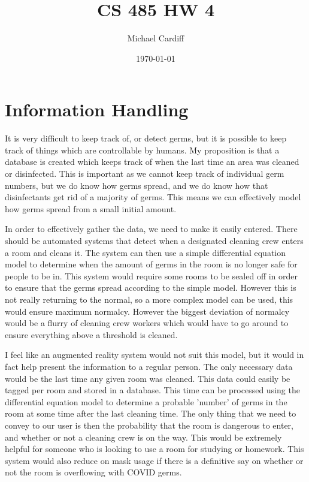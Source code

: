 \documentclass[12pt]{article}
\title{CS 485 HW 4}
\author{Michael Cardiff}
\date{\today}
\begin{document}
\maketitle

\section{Information Handling}
It is very difficult to keep track of, or detect germs, but it is possible to keep track of things which are controllable by humans. My proposition is that a database is created which keeps track of when the last time an area was cleaned or disinfected. This is important as we cannot keep track of individual germ numbers, but we do know how germs spread, and we do know how that disinfectants get rid of a majority of germs. This means we can effectively model how germs spread from a small initial amount. 

In order to effectively gather the data, we need to make it easily entered. There should be automated systems that detect when a designated cleaning crew enters a room and cleans it. The system can then use a simple differential equation model to determine when the amount of germs in the room is no longer safe for people to be in. This system would require some rooms to be sealed off in order to ensure that the germs spread according to the simple model. However this is not really returning to the normal, so a more complex model can be used, this would ensure maximum normalcy. However the biggest deviation of normalcy would be a flurry of cleaning crew workers which would have to go around to ensure everything above a threshold is cleaned.

I feel like an augmented reality system would not suit this model, but it would in fact help present the information to a regular person. The only necessary data would be the last time any given room was cleaned. This data could easily be tagged per room and stored in a database. This time can be processed using the differential equation model to determine a probable 'number' of germs in the room at some time after the last cleaning time. The only thing that we need to convey to our user is then the probability that the room is dangerous to enter, and whether or not a cleaning crew is on the way. This would be extremely helpful for someone who is looking to use a room for studying or homework. This system would also reduce on mask usage if there is a definitive say on whether or not the room is overflowing with COVID germs. 
\end{document}
